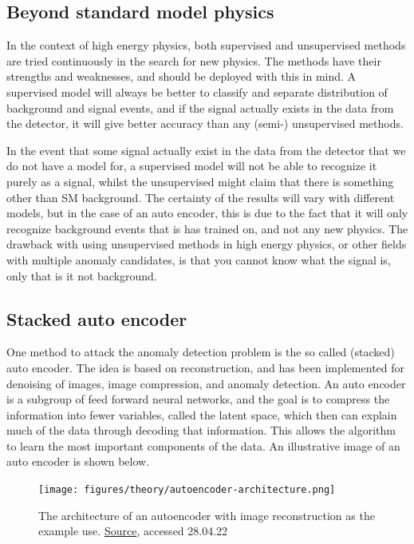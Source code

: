 \documentclass[ reprint, amsmath,amssymb, aps, nofootinbib]{revtex4-2}
\begin{document}
\subsection{Beyond standard model physics}

In the context of high energy physics, both supervised and unsupervised methods are tried continuously in the search for new physics. The methods have their strengths and weaknesses, and should be deployed with this in mind. A supervised model will always be better to classify and separate distribution of background and signal events, and if the signal actually exists in the data from the detector, it will give better accuracy than any (semi-) unsupervised methods. \par 
In the event that some signal actually exist in the data from the detector that we do not have a model for, a supervised model will not be able to recognize it purely as a signal, whilst the unsupervised might claim that there is something other than SM background. The certainty of the results will vary with different models, but in the case of an auto encoder, this is due to the fact that it will only recognize background events that is has trained on, and not any new physics. The drawback with using unsupervised methods in high energy physics, or other fields with multiple anomaly candidates, is that you cannot know what the signal is, only that is it not background. \par 



\subsection{Stacked auto encoder}
One method to attack the anomaly detection problem is the so called (stacked) auto encoder. The idea is based on reconstruction, and has been implemented for denoising of images, image compression, and anomaly detection. An auto encoder is a subgroup of feed forward neural networks, and the goal is to compress the information into fewer variables, called the latent space, which then can explain much of the data through decoding that information. This allows the algorithm to learn the most important components of the data. An illustrative image of an auto encoder is shown below. 

\begin{figure}[h]
    \centering
    \texttt{[image: figures/theory/autoencoder-architecture.png]}
    \caption{The architecture of an autoencoder with image reconstruction as the example use. \href{https://lilianweng.github.io/posts/2018-08-12-vae/}{Source}, accessed 28.04.22}
    \label{fig:auto_en_archi}
\end{figure}
\end{document}
